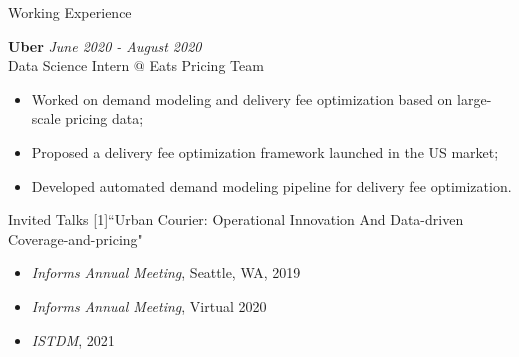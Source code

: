 \documentclass{resume} %
\begin{document}

\begin{rSection}{Working Experience}

{\bf Uber} \hfill {\em June 2020 - August 2020}
\\Data Science Intern $@$ Eats Pricing Team
\begin{itemize}
	\item Worked on demand modeling and delivery fee optimization based on large-scale pricing data;
	\item Proposed a delivery fee optimization framework launched in the US market;
	\item Developed automated demand modeling pipeline for delivery fee optimization.
\end{itemize}
\end{rSection}



\begin{rSection}{Invited Talks} 
[1]``Urban Courier: Operational Innovation And Data-driven Coverage-and-pricing" 
\begin{itemize}
	\item \textit{Informs Annual Meeting}, Seattle, WA, 2019
	\item \textit{Informs Annual Meeting}, Virtual 2020
	\item \textit{ISTDM}, 2021
\end{itemize}
\end{rSection}
\end{document}
